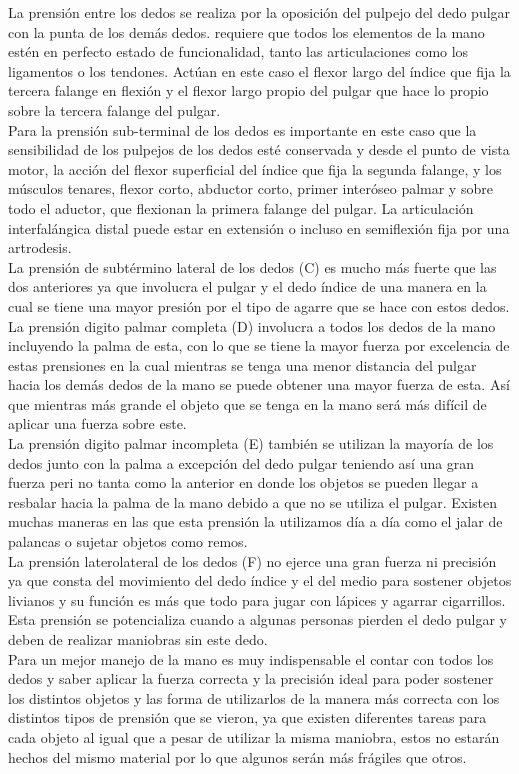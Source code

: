 \documentclass{article}
\begin{document}
La prensión entre los dedos se realiza por la oposición del pulpejo del dedo pulgar con la punta de los demás dedos. requiere que todos los elementos de la mano estén en perfecto estado de funcionalidad, tanto las articulaciones como los ligamentos o los tendones. Actúan en este caso el flexor largo del índice que fija la tercera falange en flexión y el flexor largo propio del pulgar que hace lo propio sobre la tercera falange del pulgar.
\\
Para la prensión sub-terminal de los dedos es importante en este caso que la sensibilidad de los pulpejos de los dedos esté conservada y desde el punto de vista motor, la acción del flexor superficial del índice que fija la segunda falange, y los músculos tenares, flexor corto, abductor corto, primer interóseo palmar y sobre todo el aductor, que flexionan la primera falange del pulgar. La articulación interfalángica distal puede estar en extensión o incluso en semiflexión fija por una artrodesis.
\\
La prensión de subtérmino lateral de los dedos (C) es mucho más fuerte que las dos anteriores ya que involucra el pulgar y el dedo índice de una manera en la cual se tiene una mayor presión por el tipo de agarre que se hace con estos dedos.
\\
La prensión digito palmar completa (D) involucra a todos los dedos de la mano incluyendo la palma de esta, con lo que se tiene la mayor fuerza por excelencia de estas prensiones en la cual mientras se tenga una menor distancia del pulgar hacia los demás dedos de la mano se puede obtener una mayor fuerza de esta. Así que mientras más grande el objeto que se tenga en la mano será más difícil de aplicar una fuerza sobre este.
\\
La prensión digito palmar incompleta (E) también se utilizan la mayoría de los dedos junto con la palma a excepción del dedo pulgar teniendo así una gran fuerza peri no tanta como la anterior en donde los objetos se pueden llegar a resbalar hacia la palma de la mano debido a que no se utiliza el pulgar. Existen muchas maneras en las que esta prensión la utilizamos día a día como el jalar de palancas o sujetar objetos como remos.
\\
La prensión laterolateral de los dedos (F) no ejerce una gran fuerza ni precisión ya que consta del movimiento del dedo índice y el del medio para sostener objetos livianos y su función es más que todo para jugar con lápices y agarrar cigarrillos. Esta prensión se potencializa cuando a algunas personas pierden el dedo pulgar y deben de realizar maniobras sin este dedo.
\\
Para un mejor manejo de la mano es muy indispensable el contar con todos los dedos y saber aplicar la fuerza correcta y la precisión ideal para poder sostener los distintos objetos y las forma de utilizarlos de la manera más correcta con los distintos tipos de prensión que se vieron, ya que existen diferentes tareas para cada objeto al igual que a pesar de utilizar la misma maniobra, estos no estarán hechos del mismo material por lo que algunos serán más frágiles que otros.
\end{document}
